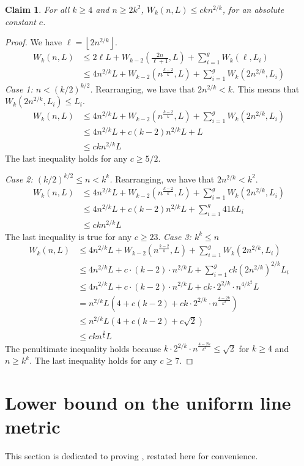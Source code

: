 \documentclass[11pt,english]{article}
\newcommand{\floor}[1]{\ensuremath{\left\lfloor#1\right\rfloor}}
\newtheorem{claim}[theorem]{Claim}
\begin{document}
\begin{claim}
For all $k \ge 4$ and $n \ge 2k^2$, $W_k(n, L) \le ckn^{2/k}$, for an absolute constant $c$.
\end{claim}
\begin{proof}
We have $\ell = \floor{2n^{2/k}}$.
\begin{align*}
W_k(n,L) &\le 2\ell L + W_{k-2}\left(\frac{2n}{\ell+1}, L\right) + \sum_{i=1}^g W_k(\ell, L_i)\\
&\le 4n^{2/k}L + W_{k-2}\left(n^{\frac{k-2}{k}},L\right) + \sum_{i=1}^g W_k\left(2n^{2/k}, L_i\right)
\end{align*}
\noindent\textit{Case 1: $n < (k/2)^{k/2}$.} Rearranging, we have that $2n^{2/k} < k$. This means that $W_k\left(2n^{2/k}, L_i\right) \le L_i$.
\begin{align*}
W_k(n,L) &\le 4n^{2/k}L + W_{k-2}\left(n^{\frac{k-2}{k}},L\right) + \sum_{i=1}^g W_k\left(2n^{2/k}, L_i\right)\\
&\le 4n^{2/k}L + c(k-2)n^{2/k}L + L\\
&\le ckn^{2/k}L
\end{align*}
The last inequality holds for any $c \ge 5/2$.

\noindent\textit{Case 2: $(k/2)^{k/2}\le n < k^k$.} Rearranging, we have that $2n^{2/k} < k^2$.
\begin{align*}
W_k(n,L) &\le 4n^{2/k}L + W_{k-2}\left(n^{\frac{k-2}{k}},L\right) + \sum_{i=1}^g W_k\left(2n^{2/k}, L_i\right)\\
&\le4n^{2/k}L + c(k-2)n^{2/k}L +\sum_{i=1}^g41kL_i\\
&\le ckn^{2/k}L
\end{align*}
The last inequality is true for any $c \ge 23$.
\noindent\textit{Case 3: $k^k \le n$}
\begin{align*}
W_k(n,L) &\le 4n^{2/k}L + W_{k-2}\left(n^{\frac{k-2}{k}},L\right) + \sum_{i=1}^g W_k\left(2n^{2/k}, L_i\right)\\
&\le 4 n^{2/k}L +c\cdot(k-2)\cdot n^{2/k}L + \sum_{i=1}^g ck(2n^{2/k})^{2/k}L_i\\
&\le 4 n^{2/k}L +c\cdot(k-2)\cdot n^{2/k}L + ck\cdot2^{2/k}\cdot n^{4/k^2}L\\
&=n^{2/k}L\left(4 + c(k-2) +ck\cdot2^{2/k}\cdot n^{\frac{4-2k}{k^2}}\right)\\
&\le n^{2/k}L\left(4 + c(k-2) +c\sqrt{2}\right)\\
&\le ckn^{\frac{2}{k}}L
\end{align*}
The penultimate inequality holds because $k\cdot2^{2/k}\cdot n^{\frac{4-2k}{k^2}} \le \sqrt{2}$ for $k\ge 4$ and $n \ge k^k$. The last inequality holds for any $c \ge 7$.
\end{proof} \section{Lower bound on the uniform line metric}\label{sec:lb}
This section is dedicated to proving , restated here for convenience.
\lb*
\end{document}
